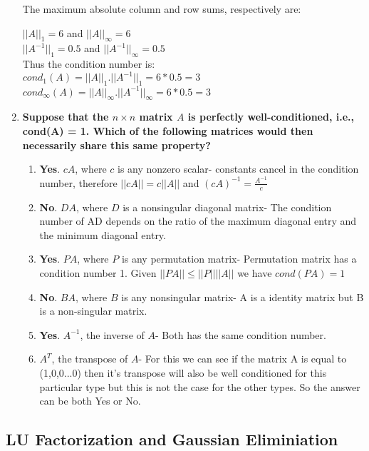 \documentclass[12pt, oneside]{article}   	%
\begin{document}
\begin{enumerate}
The maximum absolute column and row sums, respectively are:

$||A||_1=6$ and $||A||_\infty=6$\\
$||A^{-1}||_1=0.5$ and $||A^{-1}||_\infty=0.5$\\

Thus the condition number is:\\
 $cond_1(A)= ||A||_1. ||A^{-1}||_1= 6*0.5=3$\\
$cond_\infty(A)= ||A||_\infty. ||A^{-1}||_\infty= 6*0.5=3$

\item \textbf{Suppose that the $n \times n$ matrix $A$ is perfectly well-conditioned, i.e., cond(A) = 1.  Which of the following matrices would then necessarily share this same
property?}
\begin{enumerate}
	\item  \textbf{Yes}. $cA$, where $c$ is any nonzero scalar- constants cancel in the condition number, therefore $||cA||=c||A||$ and $(cA)^{-1}=\frac{A^{-1}}{c}$
	\item \textbf{No}. $DA$, where $D$ is a nonsingular diagonal matrix- The  condition number of AD depends on the ratio of the maximum diagonal entry and the minimum diagonal entry.
	\item \textbf{Yes}.  $PA$, where $P$ is any permutation matrix- Permutation matrix has a condition number 1. Given $||PA|| \leq ||P||||A||$ we have $cond(PA)=1$
	\item \textbf{No}. $BA$, where $B$ is any nonsingular matrix- A is a identity matrix but B is a non-singular matrix.
	\item \textbf{Yes}. $A^{-1}$, the inverse of $A$- Both has the same condition number.
	\item $A^T$, the transpose of $A$- For this we can see if the matrix A is equal to (1,0,0...0) then it's transpose will also be well conditioned for this particular type but this is not the case for the other types. So the answer can be both Yes or No.
\end{enumerate}


\end{enumerate}



\subsection*{LU Factorization and Gaussian Eliminiation}
\end{document}
